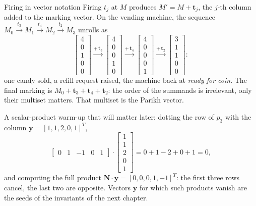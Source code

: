 \begin{definitionbox}{Firing in vector notation}
Firing $t_j$ at $M$ produces $M' = M + \mathbf{t}_j$, the $j$-th column added to the marking vector. On the vending machine, the sequence $M_0 \xrightarrow{t_3} M_1 \xrightarrow{t_4} M_2 \xrightarrow{t_2} M_3$ unrolls as
\[
\begin{bmatrix} 4 \\ 0 \\ 1 \\ 0 \\ 0 \end{bmatrix}
\xrightarrow{+\,\mathbf{t}_3}
\begin{bmatrix} 4 \\ 0 \\ 0 \\ 1 \\ 0 \end{bmatrix}
\xrightarrow{+\,\mathbf{t}_4}
\begin{bmatrix} 4 \\ 0 \\ 0 \\ 0 \\ 1 \end{bmatrix}
\xrightarrow{+\,\mathbf{t}_2}
\begin{bmatrix} 3 \\ 1 \\ 1 \\ 0 \\ 0 \end{bmatrix}:
\]
one candy sold, a refill request raised, the machine back at \emph{ready for coin}. The final marking is $M_0 + \mathbf{t}_3 + \mathbf{t}_4 + \mathbf{t}_2$: the order of the summands is irrelevant, only their multiset matters. That multiset is the Parikh vector.
\end{definitionbox}

A scalar-product warm-up that will matter later: dotting the row of $p_3$ with the column $\mathbf{y} = [1, 1, 2, 0, 1]^T$,
\[
\begin{bmatrix} 0 & 1 & -1 & 0 & 1 \end{bmatrix} \cdot \begin{bmatrix} 1 \\ 1 \\ 2 \\ 0 \\ 1 \end{bmatrix} = 0 + 1 - 2 + 0 + 1 = 0,
\]
and computing the full product $\mathbf{N} \cdot \mathbf{y} = [0, 0, 0, 1, -1]^T$: the first three rows cancel, the last two are opposite. Vectors $\mathbf{y}$ for which such products vanish are the seeds of the invariants of the next chapter.

